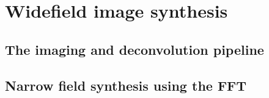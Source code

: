 \chapter{Widefield image synthesis}
\section{The imaging and deconvolution pipeline}

\section{Narrow field synthesis using the FFT}

% 
